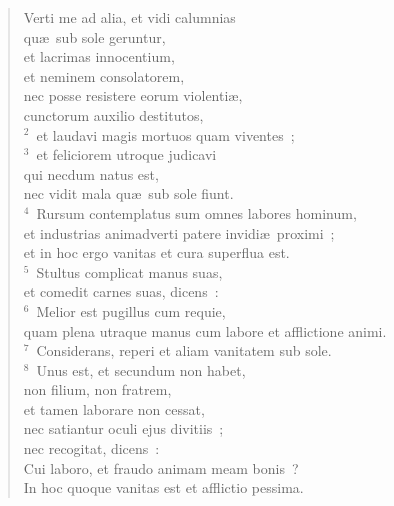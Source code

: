 \begin{flushleft}\begin{verse}\vspace{-19pt}Verti me ad alia, et vidi calumnias\\ qu\ae\ sub sole geruntur,\\ et lacrimas innocentium,\\ et neminem consolatorem,\\ nec posse resistere eorum violenti\ae ,\\ cunctorum auxilio destitutos,\\
${}^{2}$~et laudavi magis mortuos quam viventes~;\\
${}^{3}$~et feliciorem utroque judicavi\\ qui necdum natus est,\\ nec vidit mala qu\ae\ sub sole fiunt.\\
${}^{4}$~Rursum contemplatus sum omnes labores hominum,\\ et industrias animadverti patere invidi\ae\ proximi~;\\ et in hoc ergo vanitas et cura superflua est.\\
${}^{5}$~Stultus complicat manus suas,\\ et comedit carnes suas, dicens~:\\
${}^{6}$~Melior est pugillus cum requie,\\ quam plena utraque manus cum labore et afflictione animi.\\
${}^{7}$~Considerans, reperi et aliam vanitatem sub sole.\\
${}^{8}$~Unus est, et secundum non habet,\\ non filium, non fratrem,\\ et tamen laborare non cessat,\\ nec satiantur oculi ejus divitiis~;\\ nec recogitat, dicens~:\\ Cui laboro, et fraudo animam meam bonis~?\\ In hoc quoque vanitas est et afflictio pessima.\end{verse}\end{flushleft}


